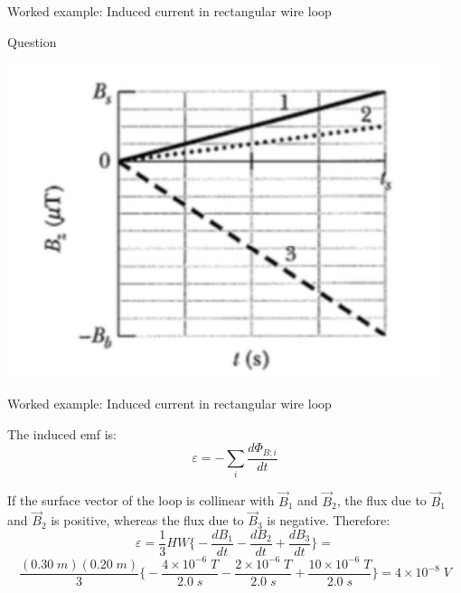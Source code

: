 {\begin{frame}{Worked example: Induced current in rectangular wire loop}
\begin{blockexmplque}{Question}
\begin{minipage}[l]{0.38\textwidth}
\begin{center}
    	 \includegraphics[width=0.95\textwidth]{./images/problems/lect08_rectangular_wire_3bfield_regions_Bz}\\
     \end{center}
    \end{minipage}

  \end{blockexmplque}

\end{frame}

%
%
%

\begin{frame}{Worked example: Induced current in rectangular wire loop}

  \vspace{-0.2cm}

  The induced emf is:
  \begin{equation*}
     \varepsilon = - \sum_{i} \frac{d\Phi_{B;i}}{dt}
  \end{equation*}

  If the surface vector of the loop is collinear with
  $\vec{B}_1$ and $\vec{B}_2$, the flux due to $\vec{B}_1$ and $\vec{B}_2$
  is positive, whereas the flux due to $\vec{B}_3$ is negative. Therefore:
  \begin{equation*}
     \varepsilon = \frac{1}{3} H W
      \Big\{ - \frac{dB_1}{dt} - \frac{dB_2}{dt} + \frac{dB_3}{dt} \Big\} =
  \end{equation*}
  \begin{equation*}
     \frac{(0.30 \; m) (0.20 \; m)}{3}
                     \Big\{ - \frac{4  \times 10^{-6} \; T}{2.0 \; s}
                            - \frac{2  \times 10^{-6} \; T}{2.0 \; s}
                            + \frac{10 \times 10^{-6} \; T}{2.0 \; s} \Big\}
     = 4 \times 10^{-8} \; V
  \end{equation*}


\end{frame}}
